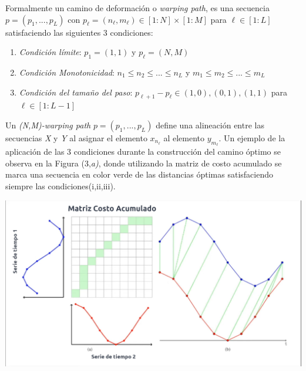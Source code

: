 	\hfill\break
	\justifying
	Formalmente un camino de deformación o \textit{warping path}, es una secuencia $p=(p_1,...,p_L)$ con $p_\ell = (n_\ell,m_\ell) \in [1:N]\times[1:M]$ para $\ell \in [1:L]$ satisfaciendo las siguientes 3 condiciones:
	\begin{enumerate}[label=(\roman*)]
		\item \textit{Condición límite}: $p_1=(1,1)$ y $p_\ell=(N,M)$
		\item \textit{Condición Monotonicidad}: $n_1\leq n_2\leq ... \leq n_L$ y $m_1\leq m_2\leq ... \leq m_L$
		\item \textit{Condición del tamaño del paso}: $p_{\ell + 1}-p_\ell\in{(1,0),(0,1),(1,1)}$ para $\ell \in [1:L-1]$
	\end{enumerate}
	
	\hfill\break
	\justifying
	Un \textit{(N,M)-warping path} $p=(p_1,...,p_L)$ define una alineación entre las secuencias \textit{X} y \textit{Y} al asignar el elemento $x_{n_\ell}$ al elemento $y_{m_\ell}$. Un ejemplo de la aplicación de las 3 condiciones durante la construcción del camino óptimo se observa en la Figura (3,\textit{a)}, donde utilizando la matriz de costo acumulado se marca una secuencia en color verde de las distancias óptimas satisfaciendo siempre las condiciones(i,ii,iii). 
	
	\hfill\break
	\begin{minipage}{\linewidth}
		\centering
		\includegraphics[width=\linewidth]{Imagenes/dtw.png}
		\label{dtw}
	\end{minipage}

